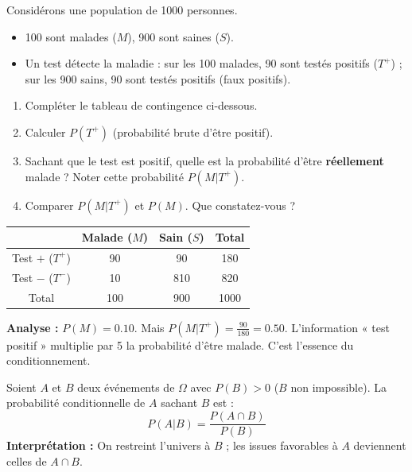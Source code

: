 \documentclass[11pt]{article}
\newcommand{\cle}[1]{{\popxbold\color{popdark}#1}}
\begin{document}
\begin{experience}
Considérons une population de \num{1000} personnes.
\begin{itemize}
    \item \num{100} sont malades ($M$), \num{900} sont saines ($S$).
    \item Un test détecte la maladie : sur les \num{100} malades, \num{90} sont testés positifs ($T^+$) ; sur les \num{900} sains, \num{90} sont testés positifs (faux positifs).
\end{itemize}
\begin{enumerate}
    \item Compléter le tableau de contingence ci-dessous.
    \item Calculer $P(T^+)$ (probabilité brute d'être positif).
    \item Sachant que le test est positif, quelle est la probabilité d'être \textbf{réellement} malade ? Noter cette probabilité $P(M | T^+)$.
    \item Comparer $P(M | T^+)$ et $P(M)$. Que constatez-vous ?
\end{enumerate}

\begin{center}
\begin{tabular}{|c|c|c|c|}\hline
 & Malade ($M$) & Sain ($S$) & Total \\ \hline
Test $+$ ($T^+$) & 90 & 90 & 180 \\
Test $-$ ($T^-$) & 10 & 810 & 820 \\ \hline
Total & 100 & 900 & 1000 \\ \hline
\end{tabular}
\end{center}

\textbf{Analyse :} $P(M) = \num{0,10}$. Mais $P(M | T^+) = \frac{90}{180} = \num{0,50}$. L'information « test positif » multiplie par 5 la probabilité d'être malade. C'est l'essence du conditionnement.
\end{experience}

\begin{definition}
Soient $A$ et $B$ deux événements de $\Omega$ avec $P(B) > 0$ ($B$ non impossible). La \cle{probabilité conditionnelle de $A$ sachant $B$} est :
\[
\boxed{P(A | B) = \frac{P(A \cap B)}{P(B)}}
\]
\textbf{Interprétation :} On restreint l'univers à $B$ ; les issues favorables à $A$ deviennent celles de $A \cap B$.
\end{definition}
\end{document}
